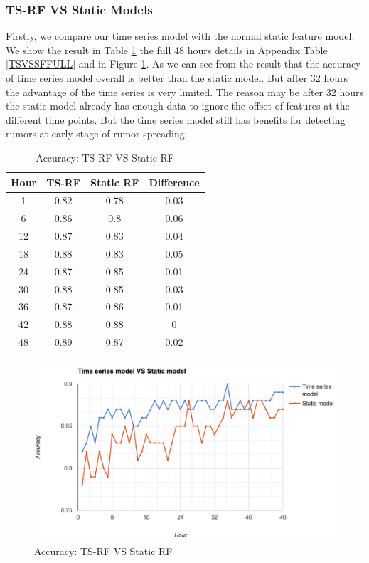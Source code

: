     \subsubsection{TS-RF VS Static Models} 

Firstly, we compare our time series model with the normal static feature model. We show the result in Table \ref{TVSF} the full 48 hours details in Appendix Table \ref{TSVSSFFULL} and in Figure \ref{fig:TVSF}. As we can see from the result that the accuracy of time series model overall is better than the static model. But after 32 hours the advantage of the time series is very limited. The reason may be after 32 hours the static model already has enough data to ignore the offset of features at the different time points. But the time series model still has benefits for detecting rumors at early stage of rumor spreading.  
 
\begin{table}[!h]
\centering
\begin{tabular}{|c|c c |c|}
\hline
Hour & TS-RF & Static RF & Difference \\ \hline
1    & 0.82              & 0.78         & 0.03       \\
6    & 0.86              & 0.8          & 0.06       \\
12   & 0.87              & 0.83         & 0.04       \\
18   & 0.88              & 0.83         & 0.05       \\
24   & 0.87              & 0.85         & 0.01       \\
30   & 0.88              & 0.85         & 0.03       \\
36   & 0.87              & 0.86         & 0.01          \\
42   & 0.88              & 0.88         & 0          \\
48   & 0.89              & 0.87         & 0.02      \\\hline

\end{tabular}
\caption{Accuracy: TS-RF VS Static RF}
\label{TVSF}
\end{table}

\begin{figure}[!h]
\centering
\includegraphics[width=0.8\columnwidth]{images/Vsstatic.png}
\caption{Accuracy: TS-RF VS Static RF}
\label{fig:TVSF}
\end{figure}

